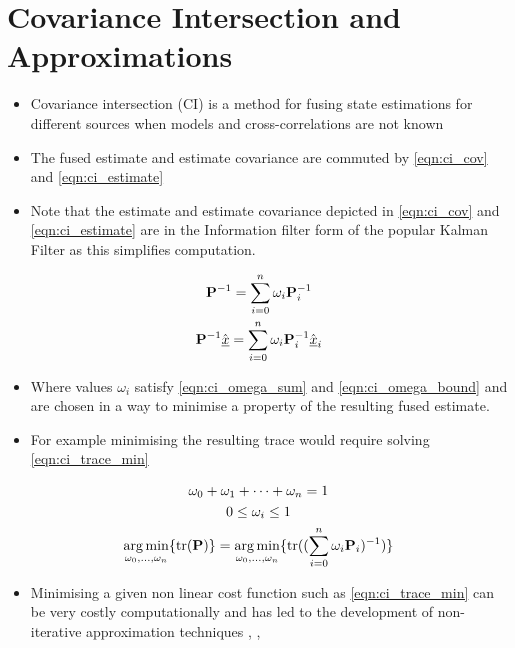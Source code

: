 \documentclass[letterpaper, 10 pt, conference]{ieeeconf}  %
\begin{document}
\section{Covariance Intersection and Approximations}
\begin{itemize}
   \item Covariance intersection (CI) is a method for fusing state estimations for different sources when models and cross-correlations are not known
   \item The fused estimate and estimate covariance are commuted by \eqref{eqn:ci_cov} and \eqref{eqn:ci_estimate}
   \item Note that the estimate and estimate covariance depicted in \eqref{eqn:ci_cov} and \eqref{eqn:ci_estimate} are in the Information filter form of the popular Kalman Filter as this simplifies computation.
\end{itemize}
\begin{gather}
   {\ensuremath{{\mathbf{P}}}}^{-1}=\sum_{i=0}^{n}\omega_i {{\mathbf{P}}}_i^{-1} \label{eqn:ci_cov}\\
   {{\mathbf{P}}}^{-1} \hat{{\underline{x}}} =\sum_{i=0}^{n}\omega_i {{\mathbf{P}}}_i^{-1} \hat{{\underline{x}}}_i \label{eqn:ci_estimate}\\
\end{gather}
\begin{itemize}
   \item Where values $\omega_i$ satisfy \eqref{eqn:ci_omega_sum} and \eqref{eqn:ci_omega_bound} and are chosen in a way to minimise a property of the resulting fused estimate. 
   \item For example minimising the resulting trace would require solving \eqref{eqn:ci_trace_min}
\end{itemize}
\begin{gather}
   \omega_0 + \omega_1 + \cdots + \omega_n = 1 \label{eqn:ci_omega_sum}\\
   0 \leq \omega_i \leq 1 \label{eqn:ci_omega_bound}\\
   \operatorname*{arg\,min}_{\omega_0,\dots,\omega_n} \{\operatorname{tr}({{\mathbf{P}}})\} = \operatorname*{arg\,min}_{\omega_0,\dots,\omega_n} \{\operatorname{tr}((\sum_{i=0}^{n}\omega_i {{\mathbf{P}}}_i)^{-1})\} \label{eqn:ci_trace_min}
\end{gather}
\begin{itemize}
   \item Minimising a given non linear cost function such as \eqref{eqn:ci_trace_min} can be very costly computationally and has led to the development of non-iterative approximation techniques \cite{niehsenInformationFusionBased2002}, \cite{frankenImprovedFastCovariance2005}, \cite{congOrderInsensitiveSequential2016}
\end{itemize}
\end{document}
